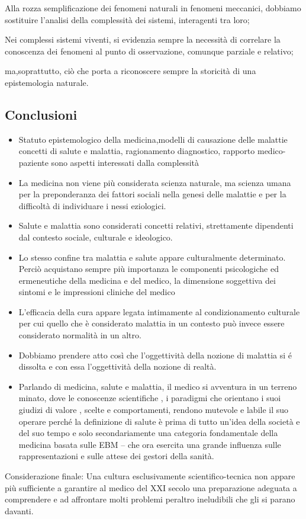   Alla rozza semplificazione dei fenomeni naturali in fenomeni
  meccanici, dobbiamo sostituire l'analisi della complessità dei
  sistemi, interagenti tra loro;

  Nei complessi sistemi viventi, si evidenzia sempre la necessità di
  correlare la conoscenza dei fenomeni al punto di osservazione,
  comunque parziale e relativo;

  ma,soprattutto, ciò che porta a riconoscere sempre la storicità di una
  epistemologia naturale.

  \subsection{Conclusioni}

\begin{itemize}
\item
  Statuto epistemologico della medicina,modelli di causazione delle
  malattie concetti di salute e malattia, ragionamento diagnostico,
  rapporto medico-paziente sono aspetti interessati dalla complessità
\item
  La medicina non viene più considerata scienza naturale, ma scienza
  umana per la preponderanza dei fattori sociali nella genesi delle
  malattie e per la difficoltà di individuare i nessi eziologici.
\item
  Salute e malattia sono considerati concetti relativi, strettamente
  dipendenti dal contesto sociale, culturale e ideologico.
\item
  Lo stesso confine tra malattia e salute appare culturalmente
  determinato. Perciò acquistano sempre più importanza le componenti
  psicologiche ed ermeneutiche della medicina e del medico, la
  dimensione soggettiva dei sintomi e le impressioni cliniche del medico
\item
  L'efficacia della cura appare legata intimamente al condizionamento
  culturale per cui quello che è considerato malattia in un contesto può
  invece essere considerato normalità in un altro.
\item
  Dobbiamo prendere atto così che l'oggettività della nozione di
  malattia si é dissolta e con essa l'oggettività della nozione di
  realtà.
\item
  Parlando di medicina, salute e malattia, il medico si avventura in un
  terreno minato, dove le conoscenze scientifiche , i paradigmi che
  orientano i suoi giudizi di valore , scelte e comportamenti, rendono
  mutevole e labile il suo operare perché la definizione di salute è
  prima di tutto un'idea della società e del suo tempo e solo
  secondariamente una categoria fondamentale della medicina basata sulle
  EBM -- che ora esercita una grande influenza sulle rappresentazioni e
  sulle attese dei gestori della sanità.
\end{itemize}
  Considerazione finale: Una cultura esclusivamente scientifico-tecnica
  non appare più sufficiente a garantire al medico del XXI secolo una
  preparazione adeguata a comprendere e ad affrontare molti problemi
  peraltro ineludibili che gli si parano davanti.

